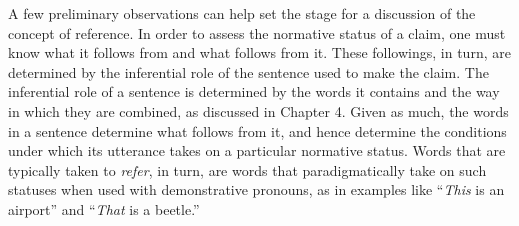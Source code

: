 A few preliminary observations can help set the stage for a discussion of the concept of reference. In order to assess the normative status of a claim, one must know what it follows from and what follows from it. These followings, in turn, are determined by the inferential role of the sentence used to make the claim. The inferential role of a sentence is determined by the words it contains and the way in which they are combined, as discussed in Chapter 4. Given as much, the words in a sentence determine what follows from it, and hence determine the conditions under which its utterance takes on a particular normative status. Words that are typically taken to \textit{refer}, in turn, are words that paradigmatically take on such statuses when used with demonstrative pronouns, as in examples like ``\textit{This} is an airport'' and ``\textit{That} is a beetle.''

